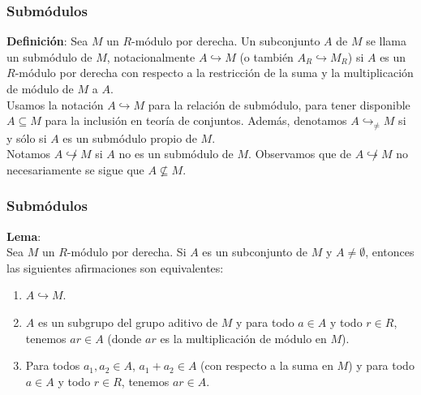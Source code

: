 \documentclass[notes=show]{beamer}%
\begin{document}
\begin{frame}
    \frametitle{Submódulos}
    \textbf{Definición}: 
    Sea \( M \) un \( R \)-módulo por derecha. Un subconjunto \( A \) de \( M \) se llama un submódulo de \( M \), 
    notacionalmente \( A \hookrightarrow M \) (o también \( A_R \hookrightarrow M_R \)) si \( A \) es un \( R \)-módulo 
    por derecha con respecto a la restricción de la suma y la multiplicación de módulo de \( M \) a \( A \).\\
    \bigskip
    Usamos la notación \( A \hookrightarrow M \) para la relación de submódulo, para tener disponible \( A \subseteq M \) 
    para la inclusión en teoría de conjuntos. Además, denotamos \( A \hookrightarrow_{\neq} M \) si y sólo si \( A \) 
    es un submódulo propio de \( M \).\\
    \bigskip
    Notamos \( A \not\hookrightarrow M \) si \( A \) no es un submódulo de \( M \). Observamos que de \( A \not\hookrightarrow M \) 
    no necesariamente se sigue que \( A \nsubseteq M \).
\end{frame}

\begin{frame}
    \frametitle{Submódulos}
    \textbf{Lema}:\\ 
    Sea \( M \) un \( R \)-módulo por derecha. Si \( A \) es un subconjunto de \( M \) y \( A \neq \emptyset \), entonces las 
    siguientes afirmaciones son equivalentes:
    \begin{enumerate}
        \item \( A \hookrightarrow M \).
        \item \( A \) es un subgrupo del grupo aditivo de \( M \) y para todo \( a \in A \) y todo \( r \in R \), tenemos 
        \( ar \in A \) (donde \( ar \) es la multiplicación de módulo en \( M \)).
        \item Para todos \( a_1, a_2 \in A \), \( a_1 + a_2 \in A \) (con respecto a la suma en \( M \)) y para todo 
        \( a \in A \) y todo \( r \in R \), tenemos \( ar \in A \).
    \end{enumerate}
\end{frame}
\end{document}
